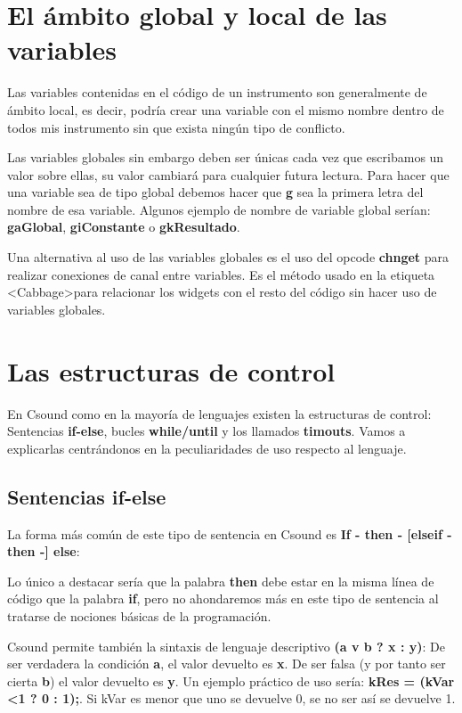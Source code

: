 \section{El ámbito global y local de las variables}

Las variables contenidas en el código de un instrumento son generalmente de ámbito local, es decir, podría crear una variable con el mismo nombre dentro de todos mis instrumento sin que exista ningún tipo de conflicto.

Las variables globales sin embargo deben ser únicas cada vez que escribamos un valor sobre ellas, su valor cambiará para cualquier futura lectura. Para hacer que una variable sea de tipo global debemos hacer que \textbf{g} sea la primera letra del nombre de esa variable. Algunos ejemplo de nombre de variable global serían: \textbf{gaGlobal}, \textbf{giConstante} o \textbf{gkResultado}.

Una alternativa al uso de las variables globales es el uso del opcode \textbf{chnget} para realizar conexiones de canal entre variables. Es el método usado en la etiqueta \textless Cabbage\textgreater para relacionar los widgets con el resto del código sin hacer uso de variables globales.

\section{Las estructuras de control}

En Csound como en la mayoría de lenguajes existen la estructuras de control: Sentencias \textbf{if-else}, bucles \textbf{while/until} y los llamados \textbf{timouts}. Vamos a explicarlas centrándonos en la peculiaridades de uso respecto al lenguaje.

\subsection{Sentencias if-else}

La forma más común de este tipo de sentencia en Csound es \textbf{If - then - [elseif - then -] else}:


Lo único a destacar sería que la palabra \textbf{then} debe estar en la misma línea de código que la palabra \textbf{if}, pero no ahondaremos más en este tipo de sentencia al tratarse de nociones básicas de la programación.

Csound permite también la sintaxis de lenguaje descriptivo \textbf{(a v b ? x : y)}: De ser verdadera la condición \textbf{a}, el valor devuelto es \textbf{x}. De ser falsa (y por tanto ser cierta \textbf{b}) el valor devuelto es \textbf{y}. Un ejemplo práctico de uso sería: \textbf{kRes = (kVar \textless 1 ? 0 : 1);}. Si kVar es menor que uno se devuelve 0, se no ser así se devuelve 1.

